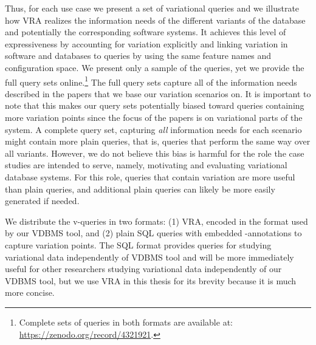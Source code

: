 %
Thus, for each use case we present a set of variational queries 
and we illustrate how VRA realizes the
information needs of the different variants of the database and potentially the 
corresponding software systems.
%
It achieves this level of expressiveness by accounting 
for variation explicitly and linking variation in software and databases to
queries by using the same feature names and configuration space.
%
We present only a  sample of the queries,
yet we provide the full query sets online.\footnote{Complete sets of queries in both formats are available at: \url{https://zenodo.org/record/4321921}.} 
%
The full query sets capture all of the information needs described in the
papers that  we base our variation scenarios on. It is important to note that
this makes our query sets potentially biased toward queries containing more
variation points since the focus of the papers is on variational parts of the
system. A complete query set, capturing \emph{all}
information needs for each scenario might contain more plain queries, that is,
queries that perform the same way over all variants.
%
However, we do not believe this bias is harmful for the role the case studies
are intended to serve, namely, motivating and evaluating variational database
systems. For this role, queries that contain variation are more useful than
plain queries, and additional plain queries can likely be more easily generated
if needed.

We distribute the v-queries in two formats: (1) VRA,
encoded in the format used by
our VDBMS tool, and (2) plain SQL queries with embedded 
-annotations to capture variation points.
%
The SQL format provides queries for studying variational data 
independently of VDBMS tool and
will be more immediately useful for other researchers
studying variational data independently of our VDBMS tool, 
but we use VRA in
this thesis for its brevity
because it is much more concise.


